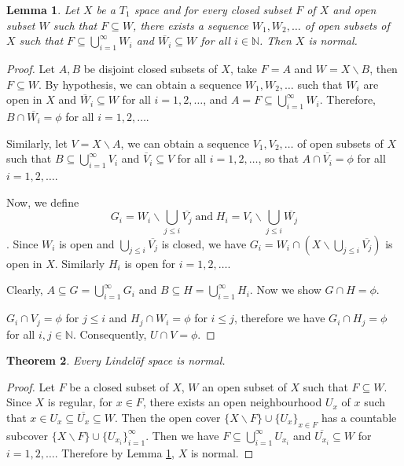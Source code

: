 \documentclass[12pt,oneside,english]{amsbook}
\numberwithin{equation}{section} %
\numberwithin{figure}{section} %
\theoremstyle{plain}
\numberwithin{section}{chapter}
\newtheorem{thm}{Theorem}[section]
\theoremstyle{plain}
\newtheorem{lem}[thm]{Lemma}
\begin{document}
\begin{lem}\label{lindelof:lem:4}
  Let $X$ be a $T_1$ space and for every closed subset $F$ of $X$ and open subset $W$ such that $F \subseteq W$, there exists a sequence $W_1,W_2, \ldots$ of open subsets of $X$ such that $F \subseteq \bigcup_{i = 1}^{\infty}W_i$ and $\overline{W_i} \subseteq W$ for all $i \in \mathbb{N}$. Then $X$ is normal.
\end{lem}
\begin{proof}
  Let $A,B$ be disjoint closed subsets of $X$, take $F = A$ and $W = X \backslash B$, then $F \subseteq W$. By hypothesis, we can obtain a sequence $W_1,W_2, \ldots$ such that $W_i$ are open in $X$ and $\overline{W}_i \subseteq W$ for all $i = 1,2, \ldots$, and $A = F \subseteq \bigcup_{i = 1}^{\infty}W_i$. Therefore, $B \cap \overline{W_i} = \phi$ for all  $i = 1,2, \ldots$.

  Similarly, let $V = X \backslash A$, we can obtain a sequence $V_1, V_2, \ldots$ of open subsets of $X$ such that $B \subseteq \bigcup_{i = 1}^{\infty}V_i$ and $\overline{V}_i \subseteq V$ for all  $i = 1,2, \ldots$, so that $A \cap \overline{V_i} = \phi$ for all  $i = 1,2, \ldots$.

  Now, we define $$G_i = W_i \backslash \bigcup_{j \leq i}\overline{V_j} \; \text{and} \; H_i = V_i \backslash \bigcup_{j \leq i}\overline{W_j}$$. Since $W_i$ is open and $\bigcup_{j \leq i}\overline{V_j}$ is closed, we have $G_i = W_i \cap (X \backslash \bigcup_{j \leq i}\overline{V_j})$ is open in $X$. Similarly $H_i$ is open for $i = 1,2, \ldots$.

  Clearly, $A \subseteq G = \bigcup_{i = 1}^{\infty}G_i$ and $B \subseteq H = \bigcup_{i = 1}^{\infty}H_i$. Now we show $G \cap H = \phi$.

  $G_i \cap V_j = \phi$ for $j \leq i$ and $H_j \cap W_i = \phi$ for $i \leq j$, therefore we have $G_i \cap H_j = \phi$ for all $i ,j \in \mathbb{N}$. Consequently, $U \cap V = \phi$. 
\end{proof}

\begin{thm}\label{lindelof:thm:5}
  Every Lindel\"{o}f space is normal.
\end{thm}
\begin{proof}
  Let $F$ be a closed subset of $X$, $W$ an open subset of $X$ such that $F \subseteq W$. Since $X$ is regular, for $x \in F$, there exists an open neighbourhood $U_x$ of $x$ such that $x \in U_x \subseteq \overline{U_x} \subseteq W$. Then the open cover $\{X \backslash F \} \cup \{U_x \}_{x \in F}$ has a countable subcover $\{X \backslash F \} \cup \{U_{x_i}\}_{i = 1}^{\infty}$. Then we have $F \subseteq \bigcup_{i = 1}^{\infty}U_{x_i}$ and $\overline{U_{x_i}} \subseteq W$ for  $i = 1,2, \ldots$. Therefore by Lemma \ref{lindelof:lem:4}, $X$ is normal.
\end{proof}
\end{document}
